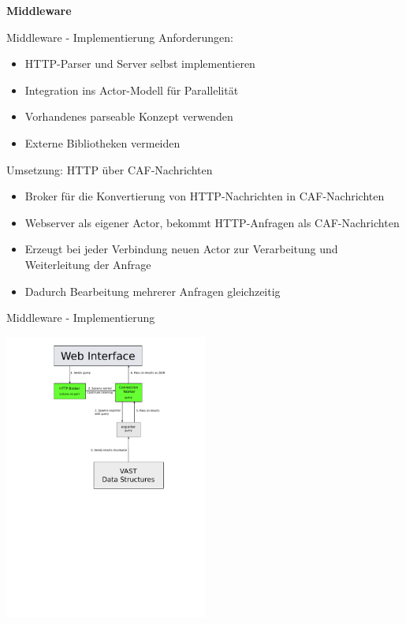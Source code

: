\documentclass[9pt]{beamer}
\begin{document}
	\begin{frame}{}
		\begin{center}
			\LARGE \textbf{Middleware}
		\end{center}
	\end{frame}

\begin{frame}{Middleware - Implementierung}{}
	Anforderungen:
	\begin{itemize}
		\item HTTP-Parser und Server selbst implementieren
		\item Integration ins Actor-Modell für Parallelität
		\item Vorhandenes parseable Konzept verwenden
		\item Externe Bibliotheken vermeiden
	\end{itemize}
	Umsetzung: HTTP über CAF-Nachrichten
	\begin{itemize}
		\item Broker für die Konvertierung von HTTP-Nachrichten in CAF-Nachrichten
		\item Webserver als eigener Actor, bekommt HTTP-Anfragen als CAF-Nachrichten
		\item Erzeugt bei jeder Verbindung neuen Actor zur Verarbeitung und Weiterleitung der Anfrage
		\item Dadurch Bearbeitung mehrerer Anfragen gleichzeitig
	\end{itemize}
\end{frame}
\begin{frame}{Middleware - Implementierung}{}
	\begin{center}
		\includegraphics[width=0.5\textwidth]{res/swp_vast_detail.pdf}
	\end{center}
\end{frame}
\end{document}
